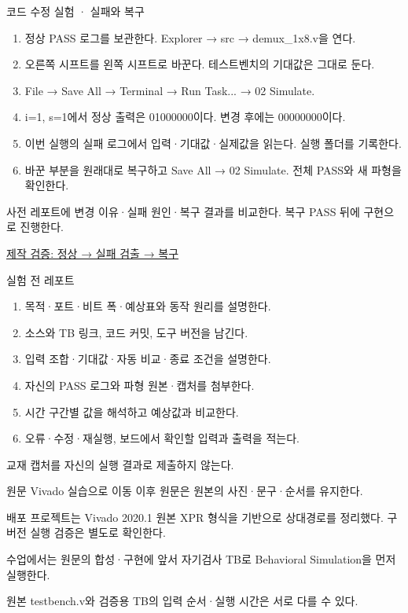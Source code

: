\begin{frame}{코드 수정 실험 · 실패와 복구}\relax
\small
\begin{enumerate}\setlength{\itemsep}{0.22cm}
\item 정상 PASS 로그를 보관한다. Explorer → src → demux\_1x8.v을 연다.
\item 오른쪽 시프트를 왼쪽 시프트로 바꾼다. 테스트벤치의 기대값은 그대로 둔다.
\item File → Save All → Terminal → Run Task... → 02 Simulate.
\item i=1, s=1에서 정상 출력은 01000000이다. 변경 후에는 00000000이다.
\item 이번 실행의 실패 로그에서 입력·기대값·실제값을 읽는다. 실행 폴더를 기록한다.
\item 바꾼 부분을 원래대로 복구하고 Save All → 02 Simulate. 전체 PASS와 새 파형을 확인한다.
\end{enumerate}
사전 레포트에 변경 이유·실패 원인·복구 결과를 비교한다. 복구 PASS 뒤에 구현으로 진행한다.\par\href{https://github.com/Glaysia/ece2_26_2_2/blob/daily/0910/example/fpga_projects_hdl/LAB1/docs/student-modification-validation.json}{제작 검증: 정상 → 실패 검출 → 복구}
\end{frame}

\begin{frame}{실험 전 레포트}\relax
\small
\begin{enumerate}\setlength{\itemsep}{0.22cm}
\item 목적·포트·비트 폭·예상표와 동작 원리를 설명한다.
\item 소스와 TB 링크, 코드 커밋, 도구 버전을 남긴다.
\item 입력 조합·기대값·자동 비교·종료 조건을 설명한다.
\item 자신의 PASS 로그와 파형 원본·캡처를 첨부한다.
\item 시간 구간별 값을 해석하고 예상값과 비교한다.
\item 오류·수정·재실행, 보드에서 확인할 입력과 출력을 적는다.
\end{enumerate}
교재 캡처를 자신의 실행 결과로 제출하지 않는다.\par
\end{frame}

\begin{frame}[label=legacy-07-vivado]{원문 Vivado 실습으로 이동}\relax
\small
이후 원문은 원본의 사진·문구·순서를 유지한다.\par\vspace{0.22cm}배포 프로젝트는 Vivado 2020.1 원본 XPR 형식을 기반으로 상대경로를 정리했다. 구버전 실행 검증은 별도로 확인한다.\par\vspace{0.22cm}수업에서는 원문의 합성·구현에 앞서 자기검사 TB로 Behavioral Simulation을 먼저 실행한다.\par\vspace{0.22cm}원본 testbench.v와 검증용 TB의 입력 순서·실행 시간은 서로 다를 수 있다.\par
\end{frame}

